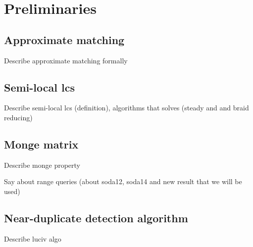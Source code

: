 \section{Preliminaries}
\label{section:preliminaries}

\subsection{Approximate matching}
Describe approximate matching formally

\subsection{Semi-local lcs}
Describe semi-local lcs (definition), algorithms that solves (steady and and braid reducing)

\subsection{Monge matrix}
Describe monge property  


Say about range queries (about soda12, soda14 and new result that we will be used)

\subsection{Near-duplicate detection algorithm}

Describe luciv algo

